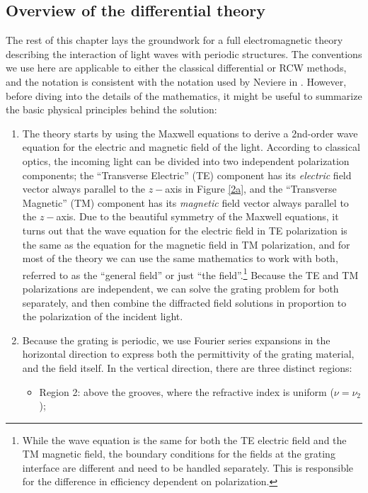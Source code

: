 \subsection{Overview of the differential theory}
\label{overview}
The rest of this chapter lays the groundwork for a full electromagnetic theory describing the interaction of light waves with periodic structures.  The conventions we use here are applicable to either the classical differential or RCW methods, and the notation is consistent with the notation used by Neviere in \cite{Nev02}.  However, before diving into the details of the mathematics, it might be useful to summarize the basic physical principles behind the solution:
  \begin{enumerate}
\item The theory starts by using the Maxwell equations to derive a 2nd-order wave equation for the electric and magnetic field of the light.  According to classical optics, the incoming light can be divided into two independent polarization components; the ``Transverse Electric'' (TE) component has its \emph{electric} field vector always parallel to the $z-$axis in Figure \ref{2a}, and the ``Transverse Magnetic'' (TM) component has its \emph{magnetic} field vector always parallel to the $z-$axis.  Due to the beautiful symmetry of the Maxwell equations, it turns out that the wave equation for the electric field in TE polarization is the same as the equation for the magnetic field in TM polarization, and for most of the theory we can use the same mathematics to work with both, referred to as the ``general field'' or just ``the field''.\footnote{While the wave equation is the same for both the TE electric field and the TM magnetic field, the boundary conditions for the fields at the grating interface are different and need to be handled separately.  This is responsible for the difference in efficiency dependent on polarization.}  Because the TE and TM polarizations are independent, we can solve the grating problem for both separately, and then combine the diffracted field solutions in proportion to the polarization of the incident light.
\item Because the grating is periodic, we use Fourier series expansions in the horizontal direction to express both the permittivity of the grating material, and the field itself. In the vertical direction, there are three distinct regions:
	\begin{itemize}
	\item Region 2: above the grooves, where the refractive index is uniform ($\nu = \nu_2$);

\end{itemize}
\end{enumerate}
